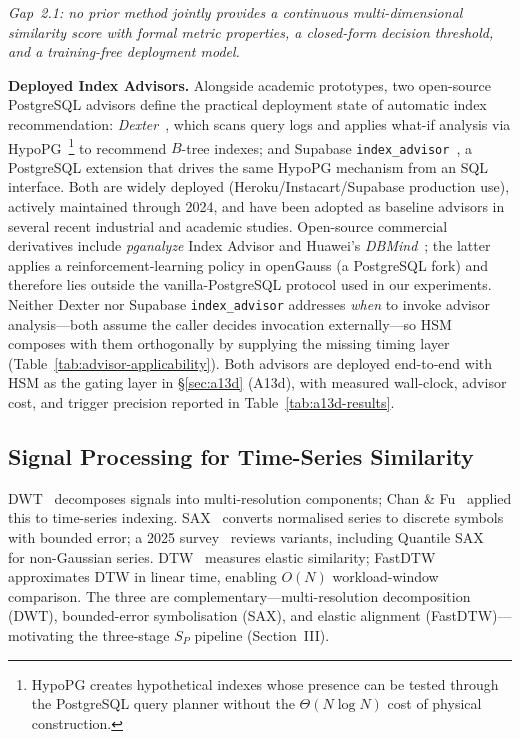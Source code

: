 \documentclass[10pt,journal,compsoc]{IEEEtran}
\newcommand{\SPER}{S_{P}}
\begin{document}
\emph{Gap~2.1: no prior method jointly provides a continuous
multi-dimensional similarity score with formal metric properties, a
closed-form decision threshold, and a training-free deployment model.}

\smallskip\noindent\textbf{Deployed Index Advisors.}
Alongside academic prototypes, two open-source PostgreSQL advisors
define the practical deployment state of automatic index
recommendation: \emph{Dexter}~\cite{AnkaneDexter}, which scans query
logs and applies what-if analysis via
HypoPG~\cite{Giraud2015HypoPG}\footnote{HypoPG creates hypothetical
indexes whose presence can be tested through the PostgreSQL query
planner without the $\Theta(N\log N)$ cost of physical
construction.} to recommend $B$-tree indexes; and Supabase
\texttt{index\_advisor}~\cite{SupabaseIndexAdvisor}, a PostgreSQL
extension that drives the same HypoPG mechanism from an SQL
interface. Both are widely deployed
(Heroku/Instacart/Supabase production use), actively maintained
through 2024, and have been adopted as baseline advisors in several
recent industrial and academic studies. Open-source commercial
derivatives include \emph{pganalyze} Index Advisor and
Huawei's \emph{DBMind}~\cite{Zhou2021DBMind}; the latter applies a
reinforcement-learning policy in openGauss (a PostgreSQL fork) and
therefore lies outside the vanilla-PostgreSQL protocol used in our
experiments. Neither Dexter nor Supabase \texttt{index\_advisor}
addresses \emph{when} to invoke advisor analysis---both assume the
caller decides invocation externally---so HSM composes with them
orthogonally by supplying the missing timing layer
(Table~\ref{tab:advisor-applicability}).
Both advisors are deployed end-to-end with HSM as the gating layer
in \S\ref{sec:a13d} (A13d), with measured wall-clock, advisor cost,
and trigger precision reported in Table~\ref{tab:a13d-results}.

\subsection{Signal Processing for Time-Series Similarity}

DWT~\cite{Daubechies1992Wavelets} decomposes signals into
multi-resolution components; Chan \& Fu~\cite{Chan2003Wavelets} applied
this to time-series indexing. SAX~\cite{Lin2007SAX} converts normalised
series to discrete symbols with bounded error; a 2025 survey~\cite{Pappa2025SAXSurvey}
reviews variants, including Quantile SAX~\cite{Silveira2023QuantileSAX}
for non-Gaussian series. DTW~\cite{Sakoe1978DTW} measures elastic
similarity; FastDTW~\cite{Salvador2007FastDTW} approximates DTW in linear
time, enabling $O(N)$ workload-window comparison. The three are complementary---multi-resolution decomposition (DWT),
bounded-error symbolisation (SAX), and elastic alignment
(FastDTW)---motivating the three-stage $\SPER$ pipeline
(Section~III).
\end{document}
